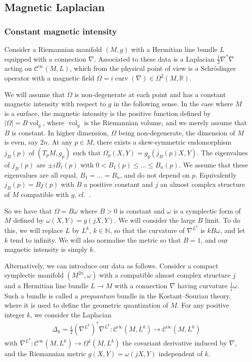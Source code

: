 \documentclass[10pt,a4paper]{article}
\theoremstyle{definition}
\numberwithin{equation}{section}
\newcommand{\R}{{\mathbb{R}}}
\newcommand{\N}{{\mathbb{N}}}
\newcommand{\om}{{\omega}}
\newcommand{\Om}{\Omega}
\newcommand{\op}{\operatorname}
\newcommand{\Ci}{{\mathcal{C}}^{\infty}}
\begin{document}
\subsection{Magnetic Laplacian}

\subsubsection{Constant magnetic intensity}
Consider a Riemannian manifold $(M,g)$ with a Hermitian line bundle $L $ equipped with a connection $\nabla$. Associated to these data is a Laplacian $\frac{1}{2} \nabla^*
\nabla$ acting on $\Ci (M, L)$, which from the physical point of view is a Schr\"odinger operator with a magnetic field $\Om = i \op{curv} (\nabla) \in
\Om^2 (M, \R)$.

We will assume that $\Om$ is non-degenerate at each point and has a constant magnetic intensity with respect to $g$ in the following sense. In the case where $M$ is a surface, the magnetic intensity is the positive function defined by $ |\Om| = B \op{vol}_g$, where $\op{vol}_g $ is the Riemannian volume, and we merely assume that $B$ is constant. In higher dimension, $\Om$ being non-degenerate, the dimension of $M$ is even, say $2n$. At any $p \in M$, there exists a skew-symmetric endomorphism $j_B (p)$ of $(T_pM, g_p)$ such that $\Om_p (X,Y) = g_p (j_B(p) X, Y)$. The eigenvalues of $j_B(p)$ are $ \pm i B_{\ell} (p)$ with $0 < B_1(p) \leqslant \ldots \leqslant B_n (p)$. We assume that these eigenvalues are all equal, $B_1 = \ldots = B_{n}$, and do not depend on $p$. Equivalently $j_B(p) = B j(p)$ with $B$ a positive constant and $j$ an almost complex structure of $M$ compatible with $g$, cf.~\cite[Proposition~2.5.6]{McSa}.

So we have that $\Om = B \om$ where $B >0$ is constant and $\om$ is a symplectic form of $M$ defined by $\om (X,Y) = g (jX, Y)$. We will consider the large $B$ limit. To do this, we will replace $L$ by $L^k$, $k \in \N$, so that the curvature of $\nabla^{L^k}$ is $k B \om$, and let $k$ tend to infinity. We will also normalise the metric so that $B=1$, and our magnetic intensity is simply $k$.

Alternatively, we can introduce our data as follows. Consider a compact symplectic manifold $(M^{2n}, \om)$ with a compatible almost complex structure $j$ and a Hermitian line bundle $L \rightarrow M$ with a connection $\nabla$ having curvature $\frac{1}{i} \om$. Such a bundle is called a {\em prequantum} bundle in the Kostant--Souriau theory, where it is used to define the geometric quantization of $M$. For any positive integer $k$, we consider the Laplacian
\begin{gather}
\Delta_k = \tfrac{1}{2}\left(\nabla^{L^k}\right)^* \nabla^{L^k} : \Ci (M, L^k)\rightarrow \Ci \left(M, L^k\right)
\end{gather}
with $\nabla^{L^k} : \Ci (M, L^k) \rightarrow \Om^1 (M, L^k)$ the covariant derivative induced by $\nabla$, and the Riemannian metric $g(X,Y) = \om (jX, Y)$ independent of $k$.
\end{document}
